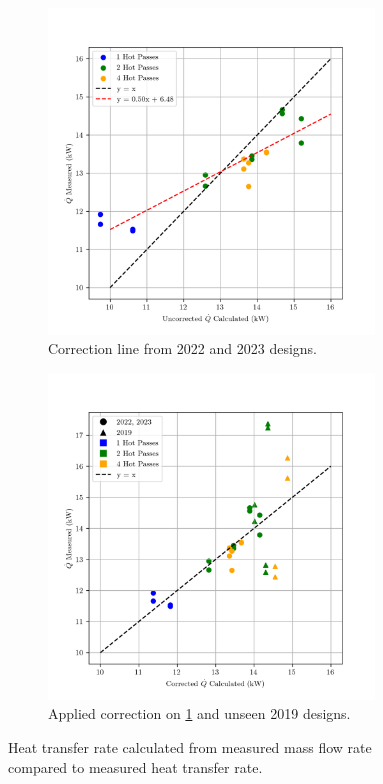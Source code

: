 \documentclass{article}
\begin{document}
\begin{figure}[H]
  \centering
  \begin{subfigure}{.49\textwidth}
    \centering
    \includegraphics[width=0.95\textwidth]{Qdot_ucalc_vs_measured.png}
    \caption{Correction line from 2022 and 2023 designs.}
    \label{fig:uncorrected_Qdot}
  \end{subfigure}
  \begin{subfigure}{.49\textwidth}
    \centering
    \includegraphics[width=0.95\textwidth]{Qdot_ccalc_vs_measured.png}
    \caption{Applied correction on \ref{fig:uncorrected_Qdot} and unseen 2019 designs.}
    \label{fig:corrected_Qdot}
  \end{subfigure}
  \label{fig:Qdot}
  \caption{Heat transfer rate calculated from measured mass flow rate compared to measured heat transfer rate.}
\end{figure}
\end{document}
